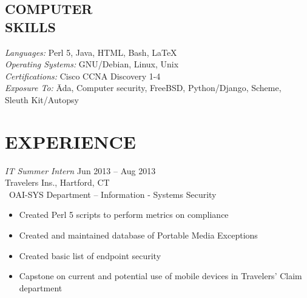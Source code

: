 \documentclass[margin]{res}
\begin{document}
\begin{resume}
\begin{tabbing}
\section{COMPUTER \\ SKILLS} {\sl Languages:} Perl 5, Java, HTML, Bash, \LaTeX\ \\
                             {\sl Operating Systems:} GNU/Debian, Linux, Unix \\
                             {\sl Certifications:} Cisco CCNA Discovery 1-4\\
                             {\sl Exposure To:} \= Ada, Computer security, FreeBSD,
                             Python/Django, Scheme, \\
                                               \> Sleuth Kit/Autopsy
                             \end{tabbing}
 
\section{EXPERIENCE} {\sl IT Summer Intern} \hfill Jun 2013 -- Aug 2013 \\
                     Travelers Ins., Hartford, CT\\\
                     OAI-SYS Department -- Information - Systems Security
                     \begin{itemize}  \itemsep -2pt %
                         \item Created Perl 5 scripts to perform metrics on 
                         compliance
                         \item Created and maintained database of Portable 
                         Media Exceptions
                         \item Created basic list of endpoint security
                         \item Capstone on current and potential use of mobile 
                         devices in Travelers' Claim department
                     \end{itemize}


\end{resume}
\end{document}
